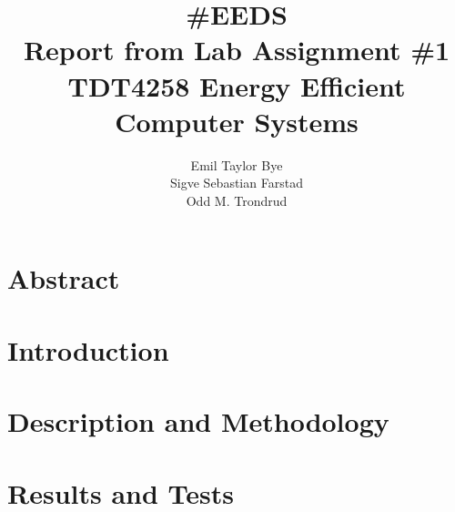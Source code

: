 \documentclass{article}
\begin{document}

\title{\#EEDS\\Report from Lab Assignment \#1\\TDT4258 Energy Efficient Computer Systems}

\author{Emil Taylor Bye\\Sigve Sebastian Farstad\\Odd M. Trondrud}

\maketitle

\newpage

\setcounter{secnumdepth}{-1}


\part{Abstract}



\newpage 

\part{Introduction}



\part{Description and Methodology}



\part{Results and Tests}
\end{document}
